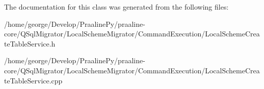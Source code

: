 The documentation for this class was generated from the following files\+:\begin{DoxyCompactItemize}
\item 
/home/george/\+Develop/\+Praaline\+Py/praaline-\/core/\+Q\+Sql\+Migrator/\+Local\+Scheme\+Migrator/\+Command\+Execution/Local\+Scheme\+Create\+Table\+Service.\+h\item 
/home/george/\+Develop/\+Praaline\+Py/praaline-\/core/\+Q\+Sql\+Migrator/\+Local\+Scheme\+Migrator/\+Command\+Execution/Local\+Scheme\+Create\+Table\+Service.\+cpp\end{DoxyCompactItemize}
